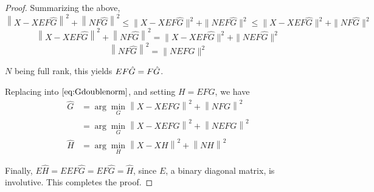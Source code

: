 \documentclass{article}
\begin{document}
\begin{proof}
Summarizing the above,
$$\left \| X - XEF\hat G\right\| ^2  + \left \| NF\hat G\right \| ^2 \leq \| X - XEF\hat G \| ^2  + \| NEF\hat G \| ^2 \leq \| X - XEF\hat G \| ^2  + \| NF\hat G \| ^2$$
$$\left \| X - XEF\hat G\right\| ^2  + \left \| NF\hat G\right \| ^2 = \| X - XEF\hat G \| ^2  + \| NEF\hat G \| ^2$$
$$\left \| NF\hat G\right \| ^2 =  \| NEF\hat G \| ^2$$

$N$ being full rank, this yields $EF\hat G = F\Hat G$.

Replacing into $\eqref{eq:Gdoublenorm}$, and setting $H = EFG$, we have
\begin{align*}
	\hat G &=  \arg \min_G  \left \| X - XEFG\right \| ^2  + \left \| NFG\right \| ^2 \\
	&=   \arg \min_G \left \| X - XEFG\right \| ^2  + \left \| NEFG\right \| ^2 \\
	\hat H &=  \arg \min_H \left \| X - XH\right \| ^2  + \left \| NH\right \| ^2
	\label{eq:4}
\end{align*}

Finally, $E\hat H = E EF\hat G = EF\hat G = \hat H$, since $E$, a binary diagonal matrix, is involutive. This completes the proof.
\end{proof}
\end{document}
